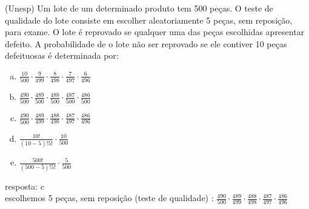 \begin{ex}
 (Unesp) Um lote de um determinado produto tem 500 peças. O teste de qualidade do lote consiste em escolher aleatoriamente 5 peças, sem reposição, para exame. O lote é reprovado se qualquer uma das peças escolhidas apresentar defeito. A probabilidade de o lote não ser reprovado se ele contiver 10 peças defeituosas é determinada por:
   \begin{enumerate}  [(a)]
       \item $\frac{10}{500}\cdot\frac{9}{499}\cdot\frac{8}{498}\cdot\frac{7}{497}\cdot\frac{6}{496}$
       \item $\frac{490}{500}\cdot\frac{489}{500}\cdot\frac{488}{500}\cdot\frac{487}{500}\cdot\frac{486}{500}$
       \item $\frac{490}{500}\cdot\frac{489}{499}\cdot\frac{488}{498}\cdot\frac{487}{497}\cdot\frac{486}{496}$
      \item $\frac{10!}{(10-5)!5!}\cdot\frac{10}{500}$
     \item $\frac{500!}{(500-5)!5!}\cdot\frac{5}{500}$
   \end{enumerate}
     \begin{sol}
      resposta: c \\
      escolhemos 5 peças, sem reposição (teste de qualidade) : $\frac{490}{500}\cdot\frac{489}{499}\cdot\frac{488}{498}\cdot\frac{487}{497}\cdot\frac{486}{496}$
     \end{sol}
 \end{ex}